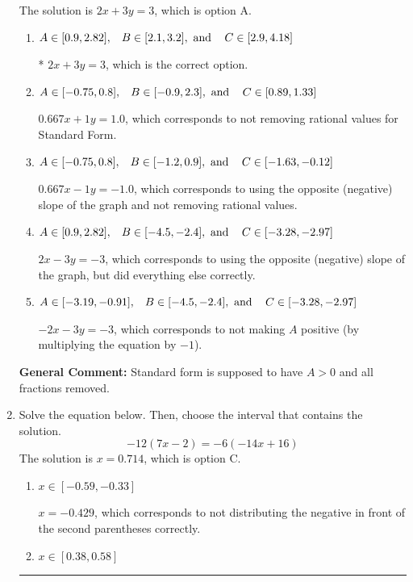 \documentclass{extbook}[14pt]
\newcommand{\litem}[1]{\item #1

\rule{\textwidth}{0.4pt}}
\begin{document}
\begin{enumerate}
{The solution is \( 2x + 3y = 3 \), which is option A.\begin{enumerate}[label=\Alph*.]
\item \( A \in [0.9, 2.82], \hspace{3mm} B \in [2.1, 3.2], \text{ and } \hspace{3mm} C \in [2.9, 4.18] \)

* $2x + 3y = 3$, which is the correct option.
\item \( A \in [-0.75, 0.8], \hspace{3mm} B \in [-0.9, 2.3], \text{ and } \hspace{3mm} C \in [0.89, 1.33] \)

 $0.667x + 1y = 1.0$, which corresponds to not removing rational values for Standard Form.
\item \( A \in [-0.75, 0.8], \hspace{3mm} B \in [-1.2, 0.9], \text{ and } \hspace{3mm} C \in [-1.63, -0.12] \)

 $0.667x - 1y = -1.0$, which corresponds to using the opposite (negative) slope of the graph and not removing rational values.
\item \( A \in [0.9, 2.82], \hspace{3mm} B \in [-4.5, -2.4], \text{ and } \hspace{3mm} C \in [-3.28, -2.97] \)

 $2x - 3y = -3$, which corresponds to using the opposite (negative) slope of the graph, but did everything else correctly.
\item \( A \in [-3.19, -0.91], \hspace{3mm} B \in [-4.5, -2.4], \text{ and } \hspace{3mm} C \in [-3.28, -2.97] \)

 $-2x - 3y = -3$, which corresponds to not making $A$ positive (by multiplying the equation by $-1$).
\end{enumerate}

\textbf{General Comment:} Standard form is supposed to have $A > 0$ and all fractions removed.
}
\litem{
Solve the equation below. Then, choose the interval that contains the solution.
\[ -12(7x -2) = -6(-14x + 16) \]The solution is \( x = 0.714 \), which is option C.\begin{enumerate}[label=\Alph*.]
\item \( x \in [-0.59, -0.33] \)

$x = -0.429$, which corresponds to not distributing the negative in front of the second parentheses correctly.
\item \( x \in [0.38, 0.58] \)


\end{enumerate}}
\end{enumerate}
\end{document}
